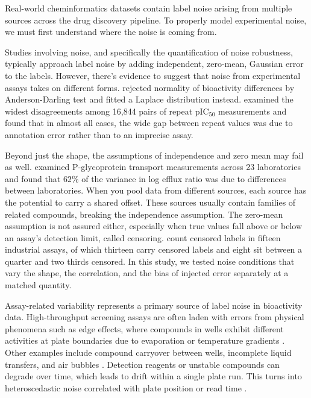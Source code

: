 Real-world cheminformatics datasets contain label noise arising from multiple sources across the drug discovery pipeline. To properly model experimental noise, we must first understand where the noise is coming from.

Studies involving noise, and specifically the quantification of noise robustness, typically approach label noise by adding independent, zero-mean, Gaussian error to the labels. However, there's evidence to suggest that noise from experimental assays takes on different forms. \cite{Kruger2012} rejected normality of bioactivity differences by Anderson-Darling test and fitted a Laplace distribution instead. \citet{Kalliokoski2013} examined the widest disagreements among 16,844 pairs of repeat pIC$_{50}$ measurements and found that in almost all cases, the wide gap between repeat values was due to annotation error rather than to an imprecise assay.

Beyond just the shape, the assumptions of independence and zero mean may fail as well. \citet{Bentz2013} examined P-glycoprotein transport measurements across 23 laboratories and found that $62\%$ of the variance in log efflux ratio was due to differences between laboratories. When you pool data from different sources, each source has the potential to carry a shared offset. These sources usually contain families of related compounds, breaking the independence assumption. The zero-mean assumption is not assured either, especially when true values fall above or below an assay's detection limit, called censoring. \citet{Svensson2025} count censored labels in fifteen industrial assays, of which thirteen carry censored labels and eight sit between a quarter and two thirds censored. In this study, we tested noise conditions that vary the shape, the correlation, and the bias of injected error separately at a matched quantity.  

Assay-related variability represents a primary source of label noise in bioactivity data. High-throughput screening assays are often laden with errors from physical phenomena such as edge effects, where compounds in wells exhibit different activities at plate boundaries due to evaporation or temperature gradients \citep{Macarron2011}. Other examples include compound carryover between wells, incomplete liquid transfers, and air bubbles  \citep{Inglese2006}.  Detection reagents or unstable compounds can degrade over time, which leads to drift within a single plate run. This turns into heteroscedastic noise correlated with plate position or read time \citep{Brideau2003}.

